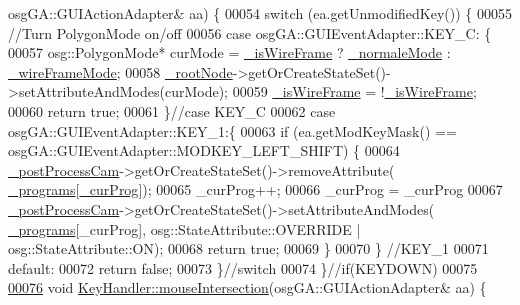 \begin{DoxyCode}
      osgGA::GUIActionAdapter& aa) \{
00054         \textcolor{keywordflow}{switch} (ea.getUnmodifiedKey()) \{
00055             \textcolor{comment}{//Turn PolygonMode on/off}
00056         \textcolor{keywordflow}{case} osgGA::GUIEventAdapter::KEY\_C: \{
00057             osg::PolygonMode* curMode = \hyperlink{classbrtr_1_1_key_handler_a6939e2c5e93e53d6090c999eae2fb927}{\_isWireFrame} ? \hyperlink{classbrtr_1_1_key_handler_ae210945e48748029cbea37fde7d601b5}{\_normaleMode} : 
      \hyperlink{classbrtr_1_1_key_handler_a7aff4e23d4c614d8e0ccdc29a3c8882f}{\_wireFrameMode};
00058             \hyperlink{classbrtr_1_1_key_handler_a2ff68d9c79145d235f50fec1da625f99}{\_rootNode}->getOrCreateStateSet()->setAttributeAndModes(curMode);
00059             \hyperlink{classbrtr_1_1_key_handler_a6939e2c5e93e53d6090c999eae2fb927}{\_isWireFrame} = !\hyperlink{classbrtr_1_1_key_handler_a6939e2c5e93e53d6090c999eae2fb927}{\_isWireFrame};
00060             \textcolor{keywordflow}{return} \textcolor{keyword}{true};
00061         \}\textcolor{comment}{//case KEY\_C}
00062         \textcolor{keywordflow}{case} osgGA::GUIEventAdapter::KEY\_1:\{
00063             \textcolor{keywordflow}{if} (ea.getModKeyMask() == osgGA::GUIEventAdapter::MODKEY\_LEFT\_SHIFT) \{
00064                 \hyperlink{classbrtr_1_1_key_handler_aa4cc5f6ac9134e473f37968dfb1dd821}{\_postProcessCam}->getOrCreateStateSet()->removeAttribute(
      \hyperlink{classbrtr_1_1_key_handler_a492d086b9458475e595b3627a8dee0f9}{\_programs}[\hyperlink{classbrtr_1_1_key_handler_a578b374029e318a509983a01253a7736}{\_curProg}]);
00065                 \_curProg++;
00066                 \_curProg = \_curProg %
00067                 \hyperlink{classbrtr_1_1_key_handler_aa4cc5f6ac9134e473f37968dfb1dd821}{\_postProcessCam}->getOrCreateStateSet()->setAttributeAndModes(
      \hyperlink{classbrtr_1_1_key_handler_a492d086b9458475e595b3627a8dee0f9}{\_programs}[\_curProg], osg::StateAttribute::OVERRIDE | osg::StateAttribute::ON);
00068                 \textcolor{keywordflow}{return} \textcolor{keyword}{true};
00069             \}
00070         \}   \textcolor{comment}{//KEY\_1}
00071         \textcolor{keywordflow}{default}:
00072             \textcolor{keywordflow}{return} \textcolor{keyword}{false};
00073         \}\textcolor{comment}{//switch  }
00074     \}\textcolor{comment}{//if(KEYDOWN)}
00075 
\hypertarget{_key_handler_8cpp_source_l00076}{}\hyperlink{classbrtr_1_1_key_handler_a7f402d48b863ed19ef47038a32d1d05c}{00076}     \textcolor{keywordtype}{void} \hyperlink{classbrtr_1_1_key_handler_a7f402d48b863ed19ef47038a32d1d05c}{KeyHandler::mouseIntersection}(osgGA::GUIActionAdapter& aa) \{

\end{DoxyCode}
